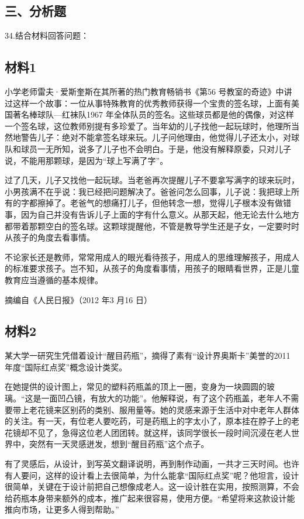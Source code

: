 \documentclass[UTF8,11pt]{ctexart}
\begin{document}
\subsection*{三、分析题}

34.结合材料回答问题：


\subsection*{材料1}

小学老师雷夫·爱斯奎斯在其所著的热门教育畅销书《第56 号教室的奇迹》中讲过这样一个故事：一位从事特殊教育的优秀教师获得一个宝贵的签名球，上面有美国著名棒球队---红袜队1967 年全体队员的签名。这些球员都是他的偶像，对这样一个签名球，这位教师别提有多珍爱了。当年幼的儿子找他一起玩球时，他理所当然地警告儿子：绝对不能拿签名球来玩。儿子问他理由，他觉得儿子还太小，对球队和球员一无所知，说多了儿子也不会明白。于是，他没有解释原委，只对儿子说，不能用那颗球，是因为“球上写满了字”。

过了几天，儿子又找他一起玩球。当老爸再次提醒儿子不要拿写满字的球来玩时，小男孩满不在乎说：我已经把问题解决了。爸爸问怎么回事，儿子说：我把球上所有的字都擦掉了。老爸气的想痛打儿子，但他转念一想，觉得儿子根本没有做错事，因为自己并没有告诉儿子上面的字有什么意义。从那天起，他无论去什么地方都带着那颗空白的签名球。这颗球提醒他，不管是教导学生还是子女，一定要时时从孩子的角度去看事情。

不论家长还是教师，常常用成人的眼光看待孩子，用成人的思维理解孩子，用成人的标准要求孩子。岂不知，从孩子的角度看事情，用孩子的眼睛看世界，正是儿童教育应当遵循的基本规律。

摘编自《人民日报》（2012 年3 月16 日）

\subsection*{材料2}

某大学一研究生凭借着设计“醒目药瓶”，摘得了素有“设计界奥斯卡”美誉的2011 年度“国际红点奖”概念设计类奖。

在她提供的设计图上，常见的塑料药瓶盖的顶上一圈，变身为一块圆圆的玻璃。“这是一面凹凸镜，有放大的功能”。他解释说，有了这个药瓶盖，老年人不需要带上老花镜来区别药的类别、服用量等。她的灵感来源于生活中对中老年人群体的关注。有一天，有位老人要吃药，可是药瓶上的字太小了，原本挂在脖子上的老花镜却不见了，急得这位老人团团转。就这样，该同学很长一段时间沉浸在老人世界中，突然有一天灵感迸发，想到“醒目药瓶”这个点子。

有了灵感后，从设计，到写英文翻译说明，再到制作动画，一共才三天时间。也许有人要问，这样的设计看上去很简单，为什么能拿“国际红点奖”呢？他坦言，设计很简单，关键在于设计前把自己想像成老人。这一设计胜在实用，按照测算，不会给药瓶本身带来额外的成本，推广起来很容易，使用方便。“希望将来这款设计能推向市场，让更多人得到帮助。”
\end{document}
